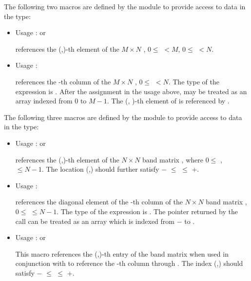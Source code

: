 The following two macros are defined by the {\dense} module to provide
access to data in the  type:
\begin{itemize}
\item {}
  \par Usage :  or
  \par {} references the (,)-th element of the $M \times N$
   , $0 \le$  $< M$, $0 \le$  $< N$.
  
\item {}
  \par Usage : 
  \par {} references the -th column of the $M \times N$
   , $0 \le$  $< N$. The type of the expression          
   is  . After the assignment in the usage    
  above,  may be treated as an array indexed from $0$ to $M-1$. 
  The (, )-th element of  is referenced by .  
\end{itemize}

The following three macros are defined by the {\band} module to provide
access to data in the  type:
\begin{itemize}
\item {}
  \par Usage :  or 
  \par {} references the (,)-th element of the
  $N \times N$ band matrix , where $0 \le$ ,  $\le N-1$.
  The location (,) should further satisfy 
  $-$ $\le$  $\le$ $+$.
\item {}
  \par Usage : 
  \par {} references the diagonal element of the -th
  column of the $N \times N$ band matrix , $0 \le$  $\le N-1$.
  The type of the expression  is . 
  The pointer returned by the call  can be treated as 
  an array which is indexed from $-$ to .
\item {}
  \par Usage :  or
  \par This macro references the (,)-th entry of the band matrix 
  when used in conjunction with  to reference the -th column through
  . The index (,) should satisfy 
  $-$ $\le$  $\le$ $+$.
\end{itemize}



